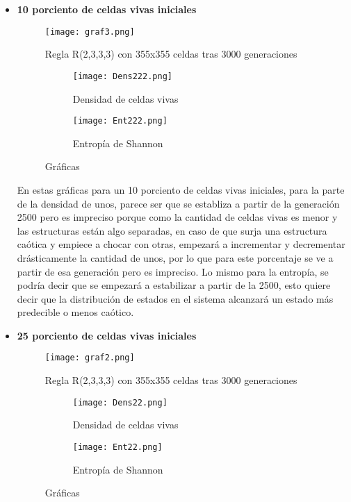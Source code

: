 \documentclass{article}
\begin{document}
	 \begin{itemize}
	 	
	 	\item \textbf{10 porciento de celdas vivas iniciales}
	 	
	 		\begin{figure}[htbp]
	 		\centering       
	 		\texttt{[image: graf3.png]}
	 		\caption{Regla R(2,3,3,3) con 355x355 celdas tras 3000 generaciones}
	 		\label{fig:3000} 
	 		\end{figure}
			
			\begin{figure}[htbp]
				\centering
				\begin{subfigure}{0.48\textwidth}
					\centering
					\texttt{[image: Dens222.png]}
					\caption{Densidad de celdas vivas}
					\label{fig:De}
				\end{subfigure}
				\hfill
				\begin{subfigure}{0.48\textwidth}
					\centering
					\texttt{[image: Ent222.png]}
					\caption{Entropía de Shannon}
					\label{fig:Ent}
				\end{subfigure}
				\caption{Gráficas}
				\label{fig:A77}
			\end{figure}
		En estas gráficas para un 10 porciento de celdas vivas iniciales, para la parte de la densidad de unos, parece ser que se establiza a partir de la generación 2500 pero es impreciso porque como la cantidad de celdas vivas es menor y las estructuras están algo separadas, en caso de que surja una estructura caótica y empiece a chocar con otras, empezará a incrementar y decrementar drásticamente la cantidad de unos, por lo que para este porcentaje se ve a partir de esa generación pero es impreciso. Lo mismo para la entropía, se podría decir que se empezará a estabilizar a partir de la 2500, esto quiere decir que la distribución de estados en el sistema alcanzará un estado más predecible o menos caótico.
		\vspace{300pt}	
	 	\item \textbf{25 porciento de celdas vivas iniciales}
	 
	 		\begin{figure}[htbp]
	 		\centering       
	 		\texttt{[image: graf2.png]}
	 		\caption{Regla R(2,3,3,3) con 355x355 celdas tras 3000 generaciones}
	 		\label{fig:300} 
	 		\end{figure}
	 		
	 		\begin{figure}[htbp]
	 			\centering
	 			\begin{subfigure}{0.48\textwidth}
	 				\centering
	 				\texttt{[image: Dens22.png]}
	 				\caption{Densidad de celdas vivas}
	 				\label{fig:A547}
	 			\end{subfigure}
	 			\hfill
	 			\begin{subfigure}{0.48\textwidth}
	 				\centering
	 				\texttt{[image: Ent22.png]}
	 				\caption{Entropía de Shannon}
	 				\label{fig:A6}
	 			\end{subfigure}
	 			\caption{Gráficas}
	 			\label{fig:A77}
	 		\end{figure}
	 	

\end{itemize}
\end{document}
